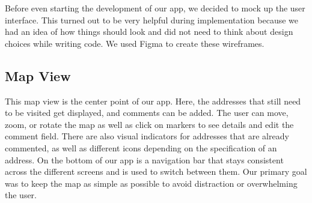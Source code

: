 \Author{\daAuthorTwo}

Before even starting the development of our app, we decided to mock up the user interface. This turned out to be very helpful during implementation because we had an idea of how things should look and did not need to think about design choices while writing code. We used Figma to create these wireframes.

\blankLine

\subsection{Map View}

This map view is the center point of our app. Here, the addresses that still need to be visited get displayed, and comments can be added. The user can move, zoom, or rotate the map as well as click on markers to see details and edit the comment field. There are also visual indicators for addresses that are already commented, as well as different icons depending on the specification of an address. On the bottom of our app is a navigation bar that stays consistent across the different screens and is used to switch between them. Our primary goal was to keep the map as simple as possible to avoid distraction or overwhelming the user.

